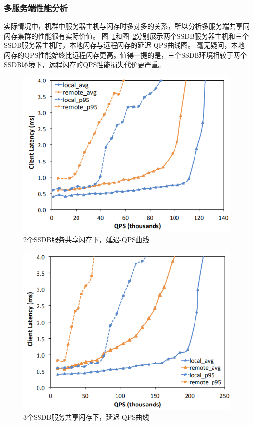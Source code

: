 \subsubsection{多服务端性能分析}
实际情况中，机群中服务器主机与闪存时多对多的关系，所以分析多服务端共享同闪存集群的性能很有实际价值。
图~\ref{fig:2SSDB_latency_QPS}和图~\ref{fig:3SSDB_latency_QPS}分别展示两个SSDB服务器主机和三个SSDB服务器主机时，本地闪存与远程闪存的延迟-QPS曲线图。
毫无疑问，本地闪存的QPS性能始终比远程闪存更高。值得一提的是，三个SSDB环境相较于两个SSDB环境下，远程闪存的QPS性能损失代价更严重。

\begin{figure}
\centering
\includegraphics[scale=0.8]{Figures/storage/2SSDB_latency_QPS.jpg}
\decoRule
\caption{2个SSDB服务共享闪存下，延迟-QPS曲线}
\label{fig:2SSDB_latency_QPS}
\end{figure}

\begin{figure}
\centering
\includegraphics[scale=0.8]{Figures/storage/3SSDB_latency_QPS.jpg}
\decoRule
\caption{3个SSDB服务共享闪存下，延迟-QPS曲线}
\label{fig:3SSDB_latency_QPS}
\end{figure}

